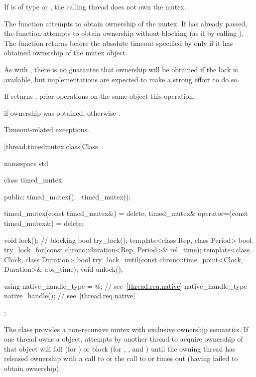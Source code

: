 \begin{itemdescr}
\pnum
\expects
If  is of type  or
, the calling thread does not own the
mutex.

\pnum
\effects
The function attempts to obtain ownership of the mutex. If
 has already passed, the function attempts to obtain ownership
without blocking (as if by calling ). The function
returns before the absolute timeout specified by
 only if it has obtained ownership of the mutex object.
\begin{note}
As with , there is no guarantee that ownership will
be obtained if the lock is available, but implementations are expected to make a
strong effort to do so.
\end{note}

\pnum
\sync
If  returns , prior 
operations on the same object 
this operation.

\pnum
\result
{}

\pnum
\returns
{} if ownership was obtained, otherwise .

\pnum
\throws
Timeout-related exceptions.
\end{itemdescr}

[thread.timedmutex.class]{Class }

%
\begin{codeblock}
namespace std {
  class timed_mutex {
  public:
    timed_mutex();
    ~timed_mutex();

    timed_mutex(const timed_mutex&) = delete;
    timed_mutex& operator=(const timed_mutex&) = delete;

    void lock();    // blocking
    bool try_lock();
    template<class Rep, class Period>
      bool try_lock_for(const chrono::duration<Rep, Period>& rel_time);
    template<class Clock, class Duration>
      bool try_lock_until(const chrono::time_point<Clock, Duration>& abs_time);
    void unlock();

    using native_handle_type = @\impdefnc@;          // see~\ref{thread.req.native}
    native_handle_type native_handle();                         // see~\ref{thread.req.native}
  };
}
\end{codeblock}

\pnum
{}%
The class  provides a non-recursive mutex with exclusive ownership
semantics. If one thread owns a  object, attempts by another thread
to acquire ownership of that object will fail (for ) or block
(for , , and ) until
the owning thread has released ownership with a call to  or the
call to  or  times out (having
failed to obtain ownership).

